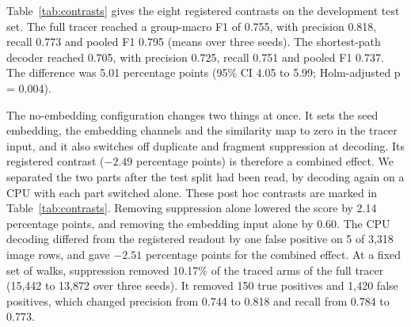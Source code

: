 Table~\ref{tab:contrasts} gives the eight registered contrasts on the development test set.
The full tracer reached a group-macro F1 of 0.755, with precision 0.818, recall 0.773 and pooled F1 0.795 (means over three seeds).
The shortest-path decoder reached 0.705, with precision 0.725, recall 0.751 and pooled F1 0.737.
The difference was 5.01 percentage points (95\% CI 4.05 to 5.99; Holm-adjusted p = 0.004).

The no-embedding configuration changes two things at once.
It sets the seed embedding, the embedding channels and the similarity map to zero in the tracer input, and it also switches off duplicate and fragment suppression at decoding.
Its registered contrast ($-2.49$ percentage points) is therefore a combined effect.
We separated the two parts after the test split had been read, by decoding again on a CPU with each part switched alone.
These post hoc contrasts are marked in Table~\ref{tab:contrasts}.
Removing suppression alone lowered the score by 2.14 percentage points, and removing the embedding input alone by 0.60.
The CPU decoding differed from the registered readout by one false positive on 5 of 3,318 image rows, and gave $-2.51$ percentage points for the combined effect.
At a fixed set of walks, suppression removed 10.17\% of the traced arms of the full tracer (15,442 to 13,872 over three seeds).
It removed 150 true positives and 1,420 false positives, which changed precision from 0.744 to 0.818 and recall from 0.784 to 0.773.

